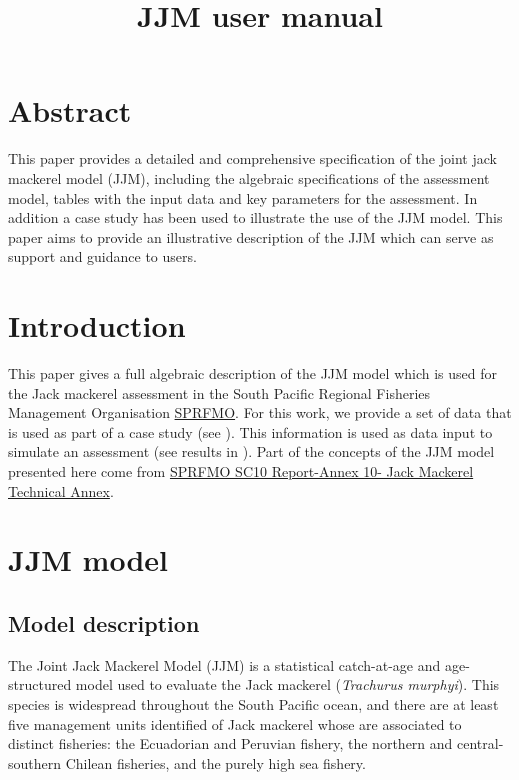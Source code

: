 \documentclass{article}
\title{JJM user manual}
\date{\parbox{\linewidth}{\centering%
  \skip
  Mirian GERONIMO \hspace*{3cm} Criscely LUJAN \endgraf\medskip
  Instituto del Mar del Perú IMARPE}
  }
\begin{document}
\maketitle

\tableofcontents
\newpage

\section*{Abstract} 
This paper provides a detailed and comprehensive specification of the joint jack mackerel model (JJM), including the algebraic specifications of the assessment model, tables with the input data and key parameters for the assessment. In addition a case study has been used to illustrate the use of the JJM model. This paper aims to provide an illustrative description of the JJM which can serve as support and guidance to users.

\section{Introduction} 

This paper gives a full algebraic description of the JJM model which is used for the Jack mackerel assessment in the South Pacific Regional Fisheries Management Organisation \href{https://www.sprfmo.int/}{SPRFMO}. For this work, we provide a set of data that is used as part of a case study (see ). This information is used as data input to simulate an assessment (see results in ). Part of the concepts of the JJM model presented here come from \href{https://www.sprfmo.int/assets/Meetings/SC/10th-SC-2022/Report-and-Annexes/Annex-8-JM-Technical-Advice-CV_2.pdf}{SPRFMO SC10 Report-Annex 10- Jack Mackerel Technical Annex}.

\section{JJM model}

\subsection{Model description}

The Joint Jack Mackerel Model (JJM) is a statistical catch-at-age and age-structured model used to evaluate the Jack mackerel (\textit{Trachurus murphyi}). This species is widespread throughout the South Pacific ocean, and there are at least five management units identified of Jack mackerel whose are associated to distinct fisheries: the Ecuadorian and Peruvian fishery, the northern and central-southern Chilean fisheries, and the purely high sea fishery. 
\end{document}
